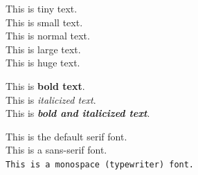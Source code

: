 \documentclass{article}
\begin{document}
{\tiny This is tiny text.} \\
{\small This is small text.} \\
{\normalsize This is normal text.} \\
{\large This is large text.} \\
{\huge This is huge text.} \\

\vspace{1em}

This is \textbf{bold text}. \\
This is \textit{italicized text}. \\
This is \textbf{\textit{bold and italicized text}}. \\

\vspace{1em}

This is the default serif font. \\
\textsf{This is a sans-serif font.} \\
\texttt{This is a monospace (typewriter) font.}
\end{document}
